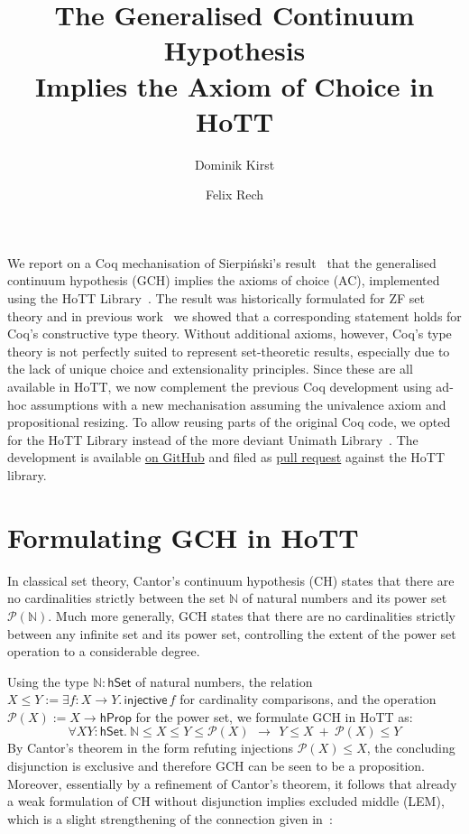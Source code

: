 \documentclass{easychair}
\title{The Generalised Continuum Hypothesis\\Implies the Axiom of Choice in HoTT}
\author{Dominik Kirst \and Felix Rech}
\institute{Saarland University, Saarland Informatics Campus, Germany}
\newcommand{\nat}{\mathbb{N}}
\newcommand{\pow}{\mathcal{P}}
\newcommand{\hprop}{\mathsf{hProp}}
\newcommand{\hset}{\mathsf{hSet}}
\begin{document}
\maketitle

We report on a Coq mechanisation of Sierpi\'nski's result~\cite{sierpinski1947hypothese} that the generalised continuum hypothesis (GCH) implies the axioms of choice (AC), implemented using the HoTT Library~\cite{bauer2017hott}.
The result was historically formulated for ZF set theory and in previous work~\cite{kirst2021generalised} we showed that a corresponding statement holds for Coq's constructive type theory.
Without additional axioms, however, Coq's type theory is not perfectly suited to represent set-theoretic results, especially due to the lack of unique choice and extensionality principles.
Since these are all available in HoTT, we now complement the previous Coq development using ad-hoc assumptions with a new mechanisation assuming the univalence axiom and propositional resizing.
To allow reusing parts of the original Coq code, we opted for the HoTT Library instead of the more deviant Unimath Library~\cite{UniMath}.
The development is available \href{https://github.com/dominik-kirst/sierpinski-hott}{on GitHub} and filed as \href{https://github.com/HoTT/HoTT/pull/1533}{pull request} against the HoTT library.

\section{Formulating GCH in HoTT}

In classical set theory, Cantor's continuum hypothesis (CH) states that there are no cardinalities strictly between the set $\nat$ of natural numbers and its power set $\pow(\nat)$.
Much more generally, GCH states that there are no cardinalities strictly between any infinite set and its power set, controlling the extent of the power set operation to a considerable degree.

Using the type $\nat:\hset$ of natural numbers, the relation $X\le Y:=\exists f:X\to Y.\, \mathsf{injective}\,f$ for cardinality comparisons, and the operation $\pow(X):=X\to\hprop$ for the power set, we formulate GCH in HoTT as:
$$\forall X Y:\hset.~\nat \le X\le Y\le \pow(X)~\,\to~\, Y\le X ~+~ \pow(X)\le Y$$
By Cantor's theorem in the form refuting injections $\pow(X)\le X$, the concluding disjunction is exclusive and therefore GCH can be seen to be a proposition.
Moreover, essentially by a refinement of Cantor's theorem, it follows that already a weak formulation of CH without disjunction implies excluded middle (LEM), which is a slight strengthening of the connection given in~\cite{bridges2016continuum}:
\end{document}
